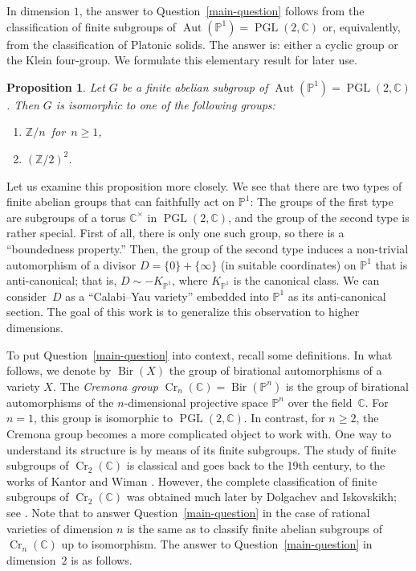 \documentclass[11pt]{amsart}
\numberwithin{equation}{section}
\newtheorem{proposition}[thm]{Proposition}
\theoremstyle{definition}
\theoremstyle{remark}
\DeclareMathOperator{\Cr}{Cr}
\DeclareMathOperator{\Aut}{Aut}
\DeclareMathOperator{\PGL}{PGL}
\DeclareMathOperator{\Bir}{Bir}
\begin{document}
In dimension $1$, the answer to Question~\ref{main-question} follows from the classification of finite subgroups of $\Aut(\mathbb{P}^1)=\PGL(2, \mathbb{C})$ or, equivalently, from the classification of Platonic solids. The answer is: either a cyclic group or the Klein four-group. We formulate this elementary result for later use.

\begin{proposition}
\label{prop-abelian-subgroup-of-pgl2}
Let $G$ be a finite abelian subgroup of $\Aut(\mathbb{P}^1)=\PGL(2, \mathbb{C})$. Then $G$ is isomorphic to one of the following groups: 
\begin{enumerate}
\item
$\mathbb{Z}/n$\ for\ $n\geq1$,
\item
$(\mathbb{Z}/2)^2$. 
\end{enumerate}
\end{proposition}

Let us examine this proposition more closely. 
We see that there are two types of finite abelian groups that can faithfully act on $\mathbb{P}^1$: The groups of the first type are subgroups of a torus $\mathbb{C}^\times$ in $\PGL(2, \mathbb{C})$, and the group of the second type is rather special. First of all, there is only one such group, so there is a ``boundedness property.'' Then, the group of the second type induces a non-trivial automorphism of a divisor $D=\{0\}+\{\infty\}$ (in suitable coordinates) on $\mathbb{P}^1$ that is anti-canonical; that is, $D\sim -K_{\mathbb{P}^1}$,  {where $K_{\mathbb{P}^1}$ is the canonical class}. We can consider~$D$ as a ``Calabi--Yau variety'' embedded into $\mathbb{P}^1$ as its anti-canonical section. 
The goal of this work is to generalize this observation to higher dimensions. 

To put Question~\ref{main-question} into context, recall some definitions.  In what follows, we denote by $\Bir(X)$ the group of birational automorphisms of a variety $X$.  The \emph{Cremona group} $\Cr_n(\mathbb{C})=\Bir(\mathbb{P}^n)$ is the group of birational automorphisms of the $n$-dimensional projective space $\mathbb{P}^n$ over the field~$\mathbb{C}$. For $n=1$, this group is isomorphic to $\PGL(2, \mathbb{C})$. In contrast, for $n\geq 2$, the Cremona group becomes a more complicated object to work with. One way to understand its structure is by means of its finite subgroups.  {The study of finite subgroups of $\Cr_2(\mathbb{C})$ is classical and goes back to the 19th century, to the works of Kantor and Wiman \cite{Kan95,Wim96}.  However, the complete classification of finite subgroups of $\Cr_2(\mathbb{C})$ was obtained much later by Dolgachev and Iskovskikh; see \cite{DI09}. } Note that to answer Question~\ref{main-question} {in the case of rational varieties} of dimension $n$ is the same as to classify finite abelian subgroups of $\Cr_n(\mathbb{C})$ up to isomorphism.  The answer to Question~\ref{main-question} in dimension~$2$ is as follows.
\end{document}
